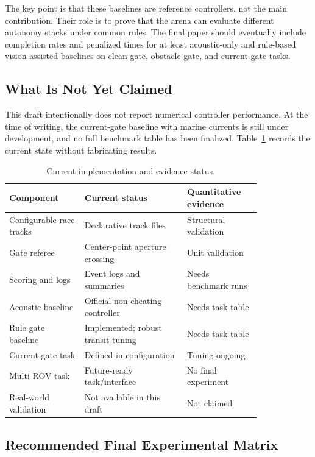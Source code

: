 The key point is that these baselines are reference controllers, not the main contribution. Their role is to prove that the arena can evaluate different autonomy stacks under common rules. The final paper should eventually include completion rates and penalized times for at least acoustic-only and rule-based vision-assisted baselines on clean-gate, obstacle-gate, and current-gate tasks.

\subsection{What Is Not Yet Claimed}

This draft intentionally does not report numerical controller performance. At the time of writing, the current-gate baseline with marine currents is still under development, and no full benchmark table has been finalized. Table~\ref{tab:implementation_status} records the current state without fabricating results.

\begin{table}[t]
\centering
\scriptsize
\renewcommand{\arraystretch}{1.08}
\caption{Current implementation and evidence status.}
\label{tab:implementation_status}
\begin{tabular}{@{}p{0.25\linewidth}p{0.34\linewidth}p{0.23\linewidth}@{}}
\toprule
Component & Current status & Quantitative evidence \\
\midrule
Configurable race tracks & Declarative track files & Structural validation \\
Gate referee & Center-point aperture crossing & Unit validation \\
Scoring and logs & Event logs and summaries & Needs benchmark runs \\
Acoustic baseline & Official non-cheating controller & Needs task table \\
Rule gate baseline & Implemented; robust transit tuning & Needs task table \\
Current-gate task & Defined in configuration & Tuning ongoing \\
Multi-ROV task & Future-ready task/interface & No final experiment \\
Real-world validation & Not available in this draft & Not claimed \\
\bottomrule
\end{tabular}
\end{table}

\subsection{Recommended Final Experimental Matrix}

